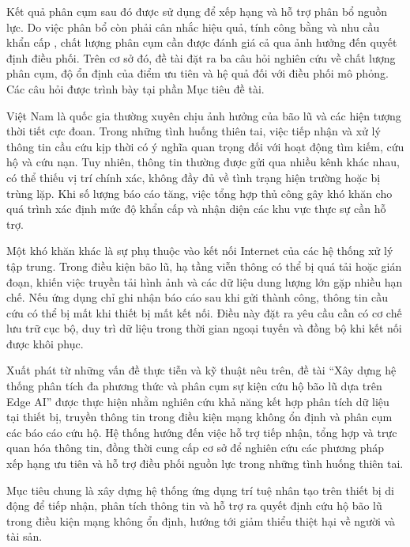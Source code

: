 Kết quả phân cụm sau đó được sử dụng để xếp hạng và hỗ trợ phân bổ nguồn lực. Do việc phân bổ còn phải cân nhắc hiệu quả, tính công bằng và nhu cầu khẩn cấp \citep{gralla2014review}, chất lượng phân cụm cần được đánh giá cả qua ảnh hưởng đến quyết định điều phối. Trên cơ sở đó, đề tài đặt ra ba câu hỏi nghiên cứu về chất lượng phân cụm, độ ổn định của điểm ưu tiên và hệ quả đối với điều phối mô phỏng. Các câu hỏi được trình bày tại phần Mục tiêu đề tài.



Việt Nam là quốc gia thường xuyên chịu ảnh hưởng của bão lũ và các hiện tượng thời tiết cực đoan. Trong những tình huống thiên tai, việc tiếp nhận và xử lý thông tin cầu cứu kịp thời có ý nghĩa quan trọng đối với hoạt động tìm kiếm, cứu hộ và cứu nạn. Tuy nhiên, thông tin thường được gửi qua nhiều kênh khác nhau, có thể thiếu vị trí chính xác, không đầy đủ về tình trạng hiện trường hoặc bị trùng lặp. Khi số lượng báo cáo tăng, việc tổng hợp thủ công gây khó khăn cho quá trình xác định mức độ khẩn cấp và nhận diện các khu vực thực sự cần hỗ trợ.

Một khó khăn khác là sự phụ thuộc vào kết nối Internet của các hệ thống xử lý tập trung. Trong điều kiện bão lũ, hạ tầng viễn thông có thể bị quá tải hoặc gián đoạn, khiến việc truyền tải hình ảnh và các dữ liệu dung lượng lớn gặp nhiều hạn chế. Nếu ứng dụng chỉ ghi nhận báo cáo sau khi gửi thành công, thông tin cầu cứu có thể bị mất khi thiết bị mất kết nối. Điều này đặt ra yêu cầu cần có cơ chế lưu trữ cục bộ, duy trì dữ liệu trong thời gian ngoại tuyến và đồng bộ khi kết nối được khôi phục.

Xuất phát từ những vấn đề thực tiễn và kỹ thuật nêu trên, đề tài ``Xây dựng hệ thống phân tích đa phương thức và phân cụm sự kiện cứu hộ bão lũ dựa trên Edge AI'' được thực hiện nhằm nghiên cứu khả năng kết hợp phân tích dữ liệu tại thiết bị, truyền thông tin trong điều kiện mạng không ổn định và phân cụm các báo cáo cứu hộ. Hệ thống hướng đến việc hỗ trợ tiếp nhận, tổng hợp và trực quan hóa thông tin, đồng thời cung cấp cơ sở để nghiên cứu các phương pháp xếp hạng ưu tiên và hỗ trợ điều phối nguồn lực trong những tình huống thiên tai.



Mục tiêu chung là xây dựng hệ thống ứng dụng trí tuệ nhân tạo trên thiết bị di động để tiếp nhận, phân tích thông tin và hỗ trợ ra quyết định cứu hộ bão lũ trong điều kiện mạng không ổn định, hướng tới giảm thiểu thiệt hại về người và tài sản.

